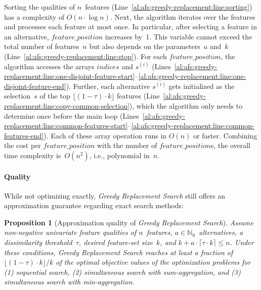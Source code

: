 \documentclass{article}
\newtheorem{proposition}{Proposition}
\theoremstyle{definition}
\begin{document}
Sorting the qualities of $n$~features (Line~\ref{al:afs:greedy-replacement:line:sorting}) has a complexity of $O(n \cdot \log n)$.
Next, the algorithm iterates over the features and processes each feature at most once.
In particular, after selecting a feature in an alternative, $feature\_position$ increases by~1.
This variable cannot exceed the total number of features~$n$ but also depends on the parameters~$a$ and~$k$ (Line~\ref{al:afs:greedy-replacement:line:stop}).
For each $feature\_position$, the algorithm accesses the arrays $indices$ and $s^{(i)}$ (Lines~\ref{al:afs:greedy-replacement:line:one-disjoint-feature-start}--\ref{al:afs:greedy-replacement:line:one-disjoint-feature-end}).
Further, each alternative $s^{(i)}$ gets initialized as the selection~$s$ of the top $\lfloor (1 - \tau) \cdot k \rfloor$ features (Line~\ref{al:afs:greedy-replacement:line:copy-common-selection}), which the algorithm only needs to determine once before the main loop (Lines~\ref{al:afs:greedy-replacement:line:common-features-start}--\ref{al:afs:greedy-replacement:line:common-features-end}).
Each of these array operation runs in $O(n)$ or faster.
Combining the cost per $feature\_position$ with the number of $feature\_position$s, the overall time complexity is~$O(n^2)$, i.e., polynomial in~$n$.

\paragraph{Quality}

While not optimizing exactly, \emph{Greedy Replacement Search} still offers an approximation guarantee regarding exact search methods:
%
\begin{proposition}[Approximation quality of \emph{Greedy Replacement Search}]
	Assume non-negative univariate feature qualities of $n$~features, $a \in \mathbb{N}_0$~alternatives, a dissimilarity threshold~$\tau$, desired feature-set size~$k$, and $k + a \cdot \lceil \tau \cdot k \rceil \leq n$.
	Under these conditions, \emph{Greedy Replacement Search} reaches at least a fraction of $\lfloor (1 - \tau) \cdot k \rfloor / k$ of the optimal objective values of the optimization problems for (1) sequential search, (2) simultaneous search with sum-aggregation, and (3) simultaneous search with min-aggregation.
	\label{prop:afs:approximation-greedy-replacement}
\end{proposition}
\end{document}
